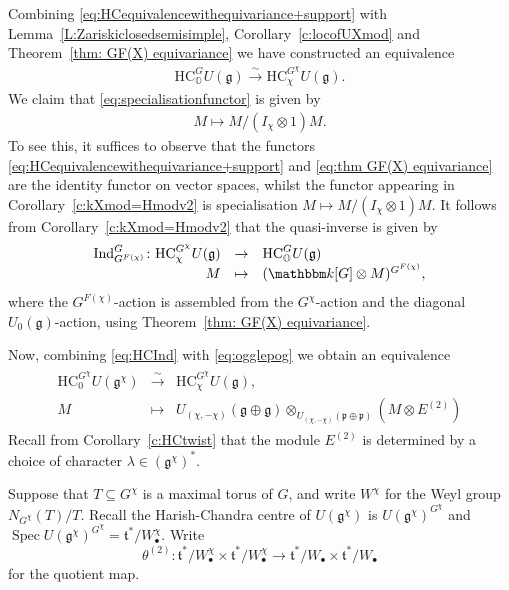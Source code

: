 \documentclass[twoside,12pt,reqno]{amsart}
\theoremstyle{remark}
\numberwithin{equation}{section}
\def\isoto{\overset{\sim}{\longrightarrow}}
\def\k{{\mathbbm k}}
\def\Spec{\operatorname{Spec}}
\def\Ind{\operatorname{Ind}}
\def\O{{\mathbb O}}
\def\HC{\mathrm{HC}}
\def\g{{\mathfrak g}}
\def\p{\mathfrak p}
\def\t{\mathfrak t}
\begin{document}
Combining \eqref{eq:HCequivalencewithequivariance+support} with Lemma~\ref{L:Zariskiclosedsemisimple}, Corollary~\ref{c:locofUXmod} and Theorem~\ref{thm: GF(X) equivariance} we have constructed an equivalence
\begin{eqnarray}
    \label{eq:specialisationfunctor}
    \HC_\O^G U(\g) \isoto \HC^{G^\chi}_\chi U(\g).
\end{eqnarray}
We claim that \eqref{eq:specialisationfunctor} is given by
\begin{eqnarray}
    M \longmapsto M / (I_\chi\otimes 1) M.
\end{eqnarray}
To see this, it suffices to observe that the functors \eqref{eq:HCequivalencewithequivariance+support} and \eqref{eq:thm GF(X) equivariance} are the identity functor on vector spaces, whilst the functor appearing in Corollary~\ref{c:kXmod=Hmodv2} is specialisation $M \mapsto M/(I_\chi\otimes 1) M$. It follows from Corollary~\ref{c:kXmod=Hmodv2} that the quasi-inverse is given by
\begin{eqnarray}
\label{eq:popcandy}
\begin{array}{rcl}
    \Ind_{G^{F(\chi)}}^G  \colon  \HC^{G^\chi}_\chi U(\g) & \to & \HC_\O^G U(\g)\\
    M & \mapsto & (\k[G] \otimes M)^{G^{F(\chi)}},
    \end{array}
\end{eqnarray}
where the $G^{F(\chi)}$-action is assembled from the $G^\chi$-action and the diagonal $U_0(\g)$-action, using Theorem~\ref{thm: GF(X) equivariance}.

Now, combining \eqref{eq:HCInd} with \eqref{eq:ogglepog} we obtain an equivalence
\begin{eqnarray}
\label{eq:HCrestrictedtoreduced}
\begin{array}{rcl}
    \HC_0^{G^\chi} U(\g^\chi) & \isoto & \HC_\chi^{G^\chi} U(\g),\\
    M & \longmapsto & U_{(\chi, -\chi)}(\g\oplus \g) \otimes_{U_{(\chi, -\chi)}(\p\oplus \p)} (M \otimes E^{(2)})
\end{array}
\end{eqnarray}
Recall from Corollary~\ref{c:HCtwist} that the module $E^{(2)}$ is determined by a choice of character $\lambda \in (\g^{\chi})^*$.

Suppose that $T \subseteq G^\chi$ is a maximal torus of $G$, and write $W^\chi$ for the Weyl group $N_{G^\chi}(T)/T$. Recall the Harish-Chandra centre of $U(\g^\chi)$ is $U(\g^\chi)^{G^\chi}$ and $\Spec U(\g^\chi)^{G^\chi} = \t^* / W^\chi_\bullet$. Write $$\theta^{(2)} : \t^*/W^\chi_\bullet \times \t^*/W^\chi_\bullet \to \t^* / W_\bullet \times \t^*/W_\bullet$$ for the quotient map.
\end{document}

